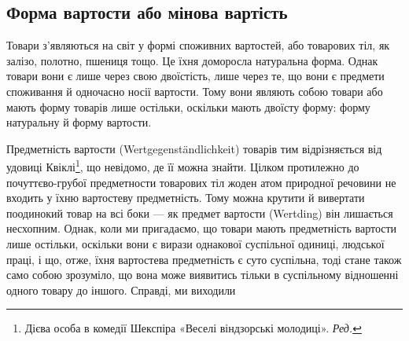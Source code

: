 \subsection{Форма вартости або мінова вартість}

Товари з’являються на світ у формі споживних вартостей, або
товарових тіл, як залізо, полотно, пшениця тощо. Це їхня доморосла
натуральна форма. Однак товари вони є лише через свою
двоїстість, лише через те, що вони є предмети споживання й одночасно
носії вартости. Тому вони являють собою товари або мають
форму товарів лише остільки, оскільки мають двоїсту форму:
форму натуральну й форму вартости.

Предметність вартости (Wertgegenständlichkeit) товарів тим
відрізняється від удовиці Квіклі\footnote*{Дієва особа в комедії
Шекспіра «Веселі віндзорські молодиці».
\emph{Ред.}
}, що невідомо, де її можна
знайти. Цілком протилежно до почуттєво-грубої предметности
товарових тіл жоден атом природної речовини не входить у їхню
вартостеву предметність. Тому можна крутити й вивертати поодинокий
товар на всі боки — як предмет вартости (Wertding)
він лишається несхопним. Однак, коли ми пригадаємо, що товари
мають предметність вартости лише остільки, оскільки вони є
вирази однакової суспільної одиниці, людської праці, і що, отже,
їхня вартостева предметність є суто суспільна, тоді стане також
само собою зрозуміло, що вона може виявитись тільки в суспільному
відношенні одного товару до іншого. Справді, ми виходили
\parbreak{}
